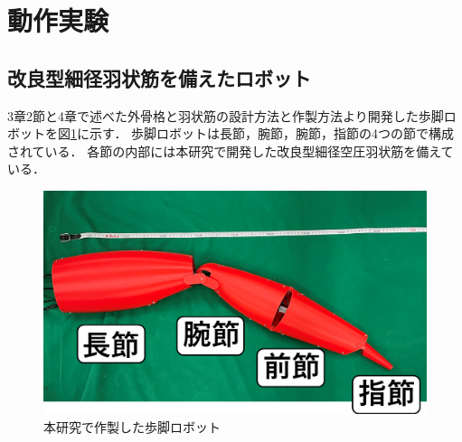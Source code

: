 \newpage
\section{動作実験}
\subsection{改良型細径羽状筋を備えたロボット}
3章2節と4章で述べた外骨格と羽状筋の設計方法と作製方法より開発した歩脚ロボットを図\ref{fig:kanirobot_new}に示す．
歩脚ロボットは長節，腕節，腕節，指節の4つの節で構成されている．
各節の内部には本研究で開発した改良型細径空圧羽状筋を備えている．

%
\begin{figure}[ht]
    \centering
    \includegraphics[scale=0.4]{image/jikki_2.png}
    \caption{本研究で作製した歩脚ロボット}
    \label{fig:kanirobot_new}
\end{figure}
%
